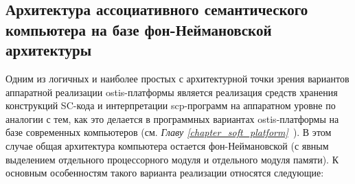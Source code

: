 \subsection{Архитектура ассоциативного семантического компьютера на базе фон-Неймановской архитектуры}
Одним из логичных и наиболее простых с архитектурной точки зрения вариантов аппаратной реализации ostis-платформы является реализация средств хранения конструкций SC-кода и интерпретации scp-программ на аппаратном уровне по аналогии с тем, как это делается в программных вариантах ostis-платформы на базе современных компьютеров (см. \textit{Главу \ref{chapter_soft_platform}~}). В этом случае общая архитектура компьютера остается фон-Неймановской (с явным выделением отдельного процессорного модуля и отдельного модуля памяти). К основным особенностям такого варианта реализации относятся следующие:
